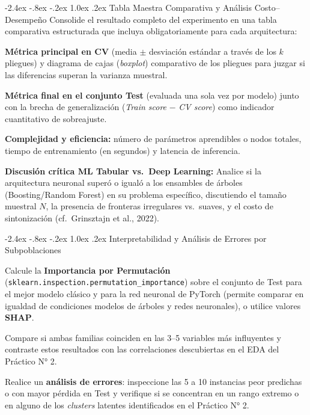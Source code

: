\documentclass[11pt,a4paper]{article}
\makeatletter
\renewcommand\subsection{\@startsection{subsection}{2}{\z@}%
  {-2.4ex \@plus -.8ex \@minus -.2ex}%
  {1.0ex \@plus .2ex}%
  {\color{BlueAccent}\normalfont\large\bfseries}}
\let\origitemize\itemize
\let\endorigitemize\enditemize
\renewenvironment{itemize}{\origitemize\setlength{\itemsep}{2pt}\setlength{\parskip}{0pt}\setlength{\parsep}{0pt}}{\endorigitemize}
\let\origenumerate\enumerate
\let\endorigenumerate\endenumerate
\renewenvironment{enumerate}{\origenumerate\setlength{\itemsep}{2pt}\setlength{\parskip}{0pt}\setlength{\parsep}{0pt}}{\endorigenumerate}
\makeatother
\begin{document}
\subsection{Tabla Maestra Comparativa y Análisis Costo–Desempeño}
Consolide el resultado completo del experimento en una tabla comparativa estructurada que incluya obligatoriamente para cada arquitectura:
\begin{enumerate}
    \item \textbf{Métrica principal en CV} (media $\pm$ desviación estándar a través de los $k$ pliegues) y diagrama de cajas (\textit{boxplot}) comparativo de los pliegues para juzgar si las diferencias superan la varianza muestral.
    \item \textbf{Métrica final en el conjunto Test} (evaluada una sola vez por modelo) junto con la brecha de generalización (\textit{Train score} $-$ \textit{CV score}) como indicador cuantitativo de sobreajuste.
    \item \textbf{Complejidad y eficiencia:} número de parámetros aprendibles o nodos totales, tiempo de entrenamiento (en segundos) y latencia de inferencia.
    \item \textbf{Discusión crítica ML Tabular vs.\ Deep Learning:} Analice si la arquitectura neuronal superó o igualó a los ensambles de árboles (Boosting/Random Forest) en su problema específico, discutiendo el tamaño muestral $N$, la presencia de fronteras irregulares vs.\ suaves, y el costo de sintonización (cf.\ Grinsztajn et al., 2022).
\end{enumerate}

\subsection{Interpretabilidad y Análisis de Errores por Subpoblaciones}
\begin{itemize}
    \item Calcule la \textbf{Importancia por Permutación} (\texttt{sklearn.inspection.permutation\_importance}) sobre el conjunto de Test para el mejor modelo clásico y para la red neuronal de PyTorch (permite comparar en igualdad de condiciones modelos de árboles y redes neuronales), o utilice valores \textbf{SHAP}.
    \item Compare si ambas familias coinciden en las 3–5 variables más influyentes y contraste estos resultados con las correlaciones descubiertas en el EDA del Práctico N° 2.
    \item Realice un \textbf{análisis de errores}: inspeccione las 5 a 10 instancias peor predichas o con mayor pérdida en Test y verifique si se concentran en un rango extremo o en alguno de los \textit{clusters} latentes identificados en el Práctico N° 2.
\end{itemize}
\end{document}
